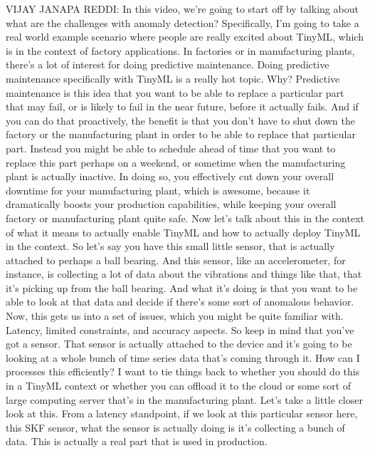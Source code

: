   VIJAY JANAPA REDDI: In this video, we're going
  to start off by talking about what are the challenges with anomaly detection?
  Specifically, I'm going to take a real world example
  scenario where people are really excited about TinyML, which is
  in the context of factory applications.
  In factories or in manufacturing plants, there's
  a lot of interest for doing predictive maintenance.
  Doing predictive maintenance specifically with TinyML
  is a really hot topic.
  Why?
  Predictive maintenance is this idea that you
  want to be able to replace a particular part that may fail,
  or is likely to fail in the near future, before it actually fails.
  And if you can do that proactively, the benefit
  is that you don't have to shut down the factory or the manufacturing plant
  in order to be able to replace that particular part.
  Instead you might be able to schedule ahead of time
  that you want to replace this part perhaps on a weekend,
  or sometime when the manufacturing plant is actually inactive.
  In doing so, you effectively cut down your overall downtime
  for your manufacturing plant, which is awesome, because it dramatically boosts
  your production capabilities, while keeping your overall factory
  or manufacturing plant quite safe.
  Now let's talk about this in the context of what
  it means to actually enable TinyML and how to actually deploy
  TinyML in the context.
  So let's say you have this small little sensor, that is actually
  attached to perhaps a ball bearing.
  And this sensor, like an accelerometer, for instance,
  is collecting a lot of data about the vibrations and things like that,
  that it's picking up from the ball bearing.
  And what it's doing is that you want to be able to look at that data
  and decide if there's some sort of anomalous behavior.
  Now, this gets us into a set of issues, which you might be quite familiar with.
  Latency, limited constraints, and accuracy aspects.
  So keep in mind that you've got a sensor.
  That sensor is actually attached to the device
  and it's going to be looking at a whole bunch of time series data
  that's coming through it.
  How can I processes this efficiently?
  I want to tie things back to whether you should do this in a TinyML context
  or whether you can offload it to the cloud or some sort of large computing
  server that's in the manufacturing plant.
  Let's take a little closer look at this.
  From a latency standpoint, if we look at this particular sensor here,
  this SKF sensor, what the sensor is actually doing
  is it's collecting a bunch of data.
  This is actually a real part that is used in production.
